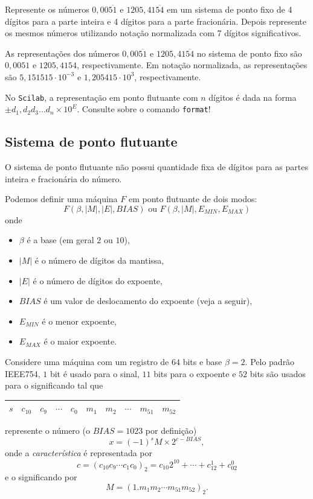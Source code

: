 \begin{ex}Represente os números $0,00\overline{51}$ e $1205,41\overline{54}$ em um sistema de ponto fixo de 4 dígitos para a parte inteira e 4 dígitos para a parte fracionária. Depois represente os mesmos números utilizando notação normalizada com 7 dígitos significativos.
\end{ex}
\begin{sol} As representações dos números $0,00\overline{51}$ e $1205,41\overline{54}$ no sistema de ponto fixo são $0,0051$ e $1205,4154$, respectivamente. Em notação normalizada, as representações são $5,151515\cdot 10^{-3}$ e $1,205415 \cdot 10^{3}$, respectivamente.
\end{sol}
\ifisscilab
\begin{obs}
  No \verb+Scilab+, a representação em ponto flutuante com $n$ dígitos é dada na forma $\pm d_1,d_2d_3\ldots d_n\times 10^{E}$. Consulte sobre o comando \verb'format'!
\end{obs}
\fi



\subsection{Sistema de ponto flutuante}

O sistema de ponto flutuante não possui quantidade fixa de dígitos para as partes inteira e fracionária do número. 

Podemos definir uma máquina $F$ em ponto flutuante de dois modos:
$$ F(\beta,|M|,|E|,BIAS) \text{ ou } F(\beta,|M|,E_{MIN},E_{MAX})$$
onde
\begin{itemize}
 \item $\beta$ é a base (em geral $2$ ou $10$),
 \item $|M|$ é o número de dígitos da mantissa,
 \item $|E|$ é o número de dígitos do expoente,
 \item $BIAS$ é um valor de deslocamento do expoente (veja a seguir),
 \item $E_{MIN}$ é o menor expoente,
 \item $E_{MAX}$ é o maior expoente.
\end{itemize}



Considere uma máquina com um registro de $64$ bits e base $\beta=2$. Pelo padrão IEEE754, $1$ bit é usado para o sinal, $11$ bits para o expoente e $52$ bits são usados para o significando tal que 
\begin{tabular}{|c|c|c|c|c|c|c|c|c|c|}
\hline
$s$ & $c_{10}$ & $c_{9}$ & $\cdots$ & $c_{0}$ & $m_1$ & $m_2$ & $\cdots$ & $m_{51}$ & $m_{52}$\\\hline
\end{tabular}
represente o número (o $BIAS=1023$ por definição)
$$ x=(-1)^{s}M \times 2^{c-BIAS},$$
onde a \emph{característica} é representada por
$$c=(c_{10}c_9\cdots c_1c_0)_2=c_{10}2^{10}+\cdots+c_12^1+c_02^0 $$
e o significando por
$$M=(1.m_1m_2\cdots m_{51}m_{52})_2.$$

